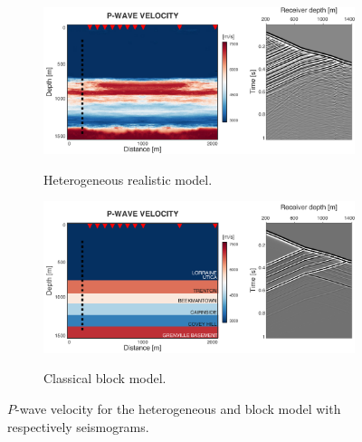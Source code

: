 \begin{figure}[!ht]
        \centering
        \begin{subfigure}[b]{1\textwidth}
                \caption{Heterogeneous realistic model.}
                \includegraphics[width=\textwidth]{fig/model_stochvsblock_a.pdf}
                \label{fig:mstochvsblock_a}
        \end{subfigure}%

        \begin{subfigure}[b]{1\textwidth}
                \caption{Classical block model.}
                \includegraphics[width=\textwidth]{fig/model_stochvsblock_b.pdf}
                \label{fig:mstochvsblock_b}
        \end{subfigure}

        \caption{$P$-wave velocity for the heterogeneous and block model with
respectively seismograms.}
        \label{fig:mstochvsblock}
\end{figure}
